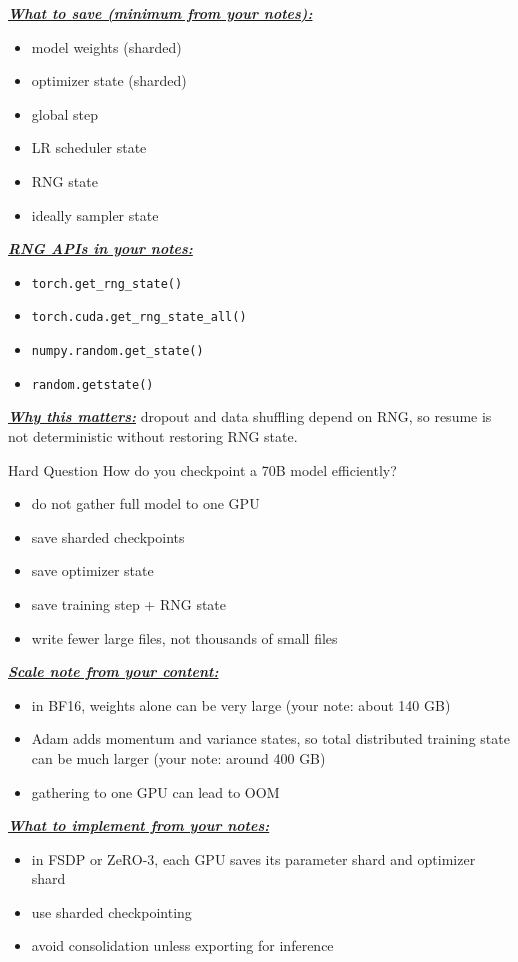 \documentclass[12pt]{article}
\newcommand{\keysent}[1]{\textbf{\textit{\uline{#1}}}}
\let\origtextbf\textbf
\renewcommand{\textbf}[1]{\origtextbf{\textit{#1}}}
\begin{document}
\keysent{What to save (minimum from your notes):}
\begin{itemize}
\item model weights (sharded)
\item optimizer state (sharded)
\item global step
\item LR scheduler state
\item RNG state
\item ideally sampler state
\end{itemize}

\keysent{RNG APIs in your notes:}
\begin{itemize}
\item \texttt{torch.get\_rng\_state()}
\item \texttt{torch.cuda.get\_rng\_state\_all()}
\item \texttt{numpy.random.get\_state()}
\item \texttt{random.getstate()}
\end{itemize}

\keysent{Why this matters:} dropout and data shuffling depend on RNG, so resume is not deterministic without restoring RNG state.

\begin{redbox}{Hard Question}
How do you checkpoint a 70B model efficiently?

\begin{itemize}
\item do not gather full model to one GPU
\item save sharded checkpoints
\item save optimizer state
\item save training step + RNG state
\item write fewer large files, not thousands of small files
\end{itemize}

\keysent{Scale note from your content:}
\begin{itemize}
\item in BF16, weights alone can be very large (your note: about 140 GB)
\item Adam adds momentum and variance states, so total distributed training state can be much larger (your note: around 400 GB)
\item gathering to one GPU can lead to OOM
\end{itemize}

\keysent{What to implement from your notes:}
\begin{itemize}
\item in FSDP or ZeRO-3, each GPU saves its parameter shard and optimizer shard
\item use sharded checkpointing
\item avoid consolidation unless exporting for inference
\end{itemize}
\end{redbox}
\end{document}

